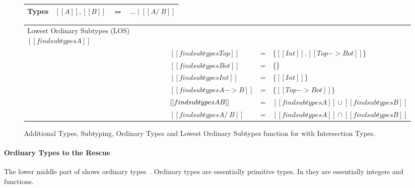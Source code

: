 \begin{figure}[t]
  \begin{small}
    \centering
    \begin{tabular}{lrcl} \toprule
      Types & $[[A]], [[B]]$ & $\Coloneqq$ & $ ... \mid [[A /\ B]] $ \\
      \bottomrule
    \end{tabular}
  \end{small}
  \medskip
    \begin{small}
    \centering
  \end{small}
  \medskip
    \begin{small}
    \centering
  \end{small}
  \medskip
    \centering
    \begin{tabular}{llcl}
      \toprule
      Lowest Ordinary Subtypes (LOS) $[[findsubtypes A]]$ &  & & \\
     & $[[findsubtypes Top]]$ & = & \{$ [[Int]], [[Top -> Bot]]$\}  \\
     & $[[findsubtypes Bot]]$ & = & \{\}  \\
     & $[[findsubtypes Int]]$ & = & \{$ [[Int]] $\}  \\
     & $[[findsubtypes A -> B]]$ & = & \{$ [[Top -> Bot]] $\}  \\
     & $[[findsubtypes A \/ B]]$ & = & $ [[findsubtypes A]] \cup [[findsubtypes B]] $\\
     & $[[findsubtypes A /\ B]]$ & = & $ [[findsubtypes A]] \cap [[findsubtypes B]] $\\
      \bottomrule
    \end{tabular}
  \caption{Additional Types, Subtyping, Ordinary Types and Lowest Ordinary Subtypes function for \cal with Intersection Types.}
  \label{fig:inter:system}
\end{figure}

\paragraph{Ordinary Types to the Rescue}
The lower middle part of
 shows ordinary types~\cite{}.
Ordinary types are essentially primitive types. In \cal they
are essentially integers and functions. 


